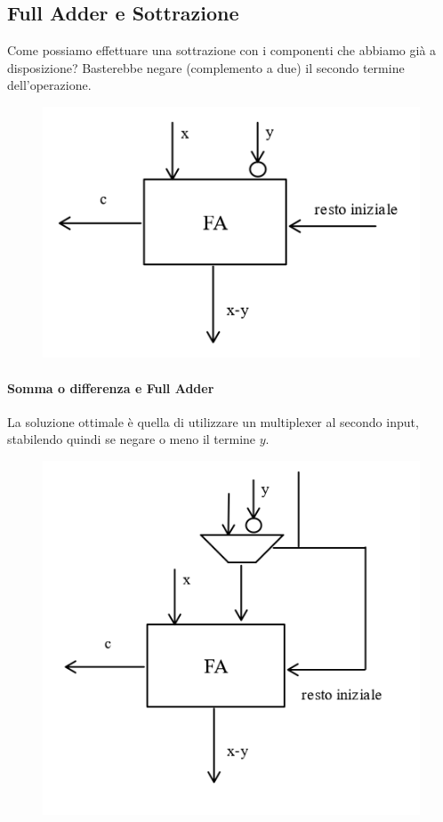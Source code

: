 \documentclass{article}
\begin{document}
\subsection{Full Adder e Sottrazione}

Come possiamo effettuare una sottrazione con i componenti che abbiamo già a disposizione? Basterebbe negare (complemento a due) il secondo termine dell'operazione.

\begin{figure}[htbp]
    \center
    \includegraphics[scale=0.35]{img/fullAdderSott.png}
\end{figure}

\paragraph{Somma o differenza e Full Adder}

La soluzione ottimale è quella di utilizzare un multiplexer al secondo input, stabilendo quindi se negare o meno il termine $y$.

\begin{figure}[htbp]
    \center
    \includegraphics[scale=0.35]{img/fullAdderSott1.png}
\end{figure}
\end{document}
